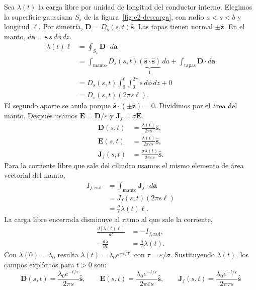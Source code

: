 \documentclass[11pt]{article}
\begin{document}
Sea $\lambda(t)$ la carga libre por unidad de longitud del
conductor interno. Elegimos la superficie gaussiana $S_s$
de la figura~\ref{fig:e2-descarga}, con radio $a<s<b$ y longitud $\ell$.
Por simetría, $\mathbf D=D_s(s,t)\hat{\mathbf s}$. Las tapas tienen
normal $\pm\hat{\mathbf z}$. En el manto,
$d\mathbf a=\hat{\mathbf s}\,s\,d\phi\,dz$.
\begin{align*}
    \lambda(t)\ell
    &=\oint_{S_s}\mathbf D\cdot d\mathbf a\\
    &=\int_{\mathrm{manto}}D_s(s,t)
        \underbrace{(\hat{\mathbf s}\cdot\hat{\mathbf s})}_{1}\,da
     +\int_{\mathrm{tapas}}\mathbf D\cdot d\mathbf a\\
    &=D_s(s,t)\int_0^\ell\!\int_0^{2\pi}s\,d\phi\,dz+0\\
    &=D_s(s,t)(2\pi s\ell).
\end{align*}
El segundo aporte se anula porque
$\hat{\mathbf s}\cdot(\pm\hat{\mathbf z})=0$.
Dividimos por el área del manto. Después usamos
$\mathbf E=\mathbf D/\varepsilon$ y $\mathbf J_f=\sigma\mathbf E$.
\begin{align*}
    \mathbf D(s,t)&=\frac{\lambda(t)}{2\pi s}\hat{\mathbf s},\\
    \mathbf E(s,t)&=\frac{\lambda(t)}{2\pi\varepsilon s}\hat{\mathbf s},\\
    \mathbf J_f(s,t)&=\frac{\sigma\lambda(t)}{2\pi\varepsilon s}
                       \hat{\mathbf s}.
\end{align*}
Para la corriente libre que sale del cilindro usamos el mismo
elemento de área vectorial del manto,
\begin{align*}
    I_{f,\mathrm{rad}}
    &=\int_{\mathrm{manto}}\mathbf J_f\cdot d\mathbf a\\
    &=J_f(s,t)(2\pi s\ell)\\
    &=\frac{\sigma}{\varepsilon}\lambda(t)\ell.
\end{align*}
La carga libre encerrada disminuye al ritmo al que sale la corriente,
\begin{align*}
    \frac{d[\lambda(t)\ell]}{dt}&=-I_{f,\mathrm{rad}},\\
    -\frac{d\lambda}{dt}&=\frac{\sigma}{\varepsilon}\lambda(t).
\end{align*}
Con $\lambda(0)=\lambda_0$ resulta
$\lambda(t)=\lambda_0 e^{-t/\tau}$, con $\tau=\varepsilon/\sigma$.
Sustituyendo $\lambda(t)$, los campos explícitos para $t > 0$ son:
\begin{equation}
    \mathbf{D}(s,t) = \frac{\lambda_0 e^{-t/\tau}}{2\pi s} \hat{\mathbf{s}}, \qquad \mathbf{E}(s,t) = \frac{\lambda_0 e^{-t/\tau}}{2\pi \varepsilon s} \hat{\mathbf{s}}, \qquad \mathbf{J}_f(s,t) = \frac{\lambda_0 e^{-t/\tau}}{2\pi \tau s} \hat{\mathbf{s}}
\end{equation}
\end{document}
